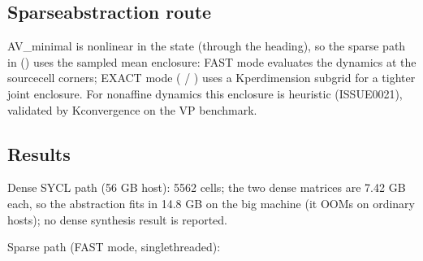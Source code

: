 \documentclass[a4paper,10pt,english]{sphinxmanual}
\begin{document}
\subsection{Sparse\sphinxhyphen{}abstraction route}
\label{\detokenize{benchmarks/AV_minimal:sparse-abstraction-route}}
\sphinxAtStartPar
AV\_minimal is nonlinear in the state (through the heading), so the sparse path in
 () uses the sampled mean enclosure:
FAST mode evaluates the dynamics at the source\sphinxhyphen{}cell corners; EXACT mode
( / ) uses a K\sphinxhyphen{}per\sphinxhyphen{}dimension sub\sphinxhyphen{}grid for a tighter joint enclosure.
For non\sphinxhyphen{}affine dynamics this enclosure is heuristic (ISSUE\sphinxhyphen{}0021), validated by
K\sphinxhyphen{}convergence on the VP benchmark.


\subsection{Results}
\label{\detokenize{benchmarks/AV_minimal:results}}
\sphinxAtStartPar
Dense SYCL path (56 GB host): 5562 cells; the two dense matrices are 7.42 GB each, so
the abstraction fits in 14.8 GB on the big machine (it OOMs on ordinary hosts); no
dense synthesis result is reported.

\sphinxAtStartPar
Sparse path (FAST mode, single\sphinxhyphen{}threaded):
\end{document}
